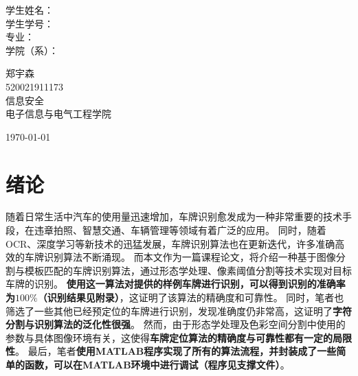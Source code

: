 \documentclass[utf8,a4paper]{ctexart}
\begin{document}
\begin{titlepage}
\begin{center}
        \begin{minipage}{0.2\textwidth}
            \begin{flushright} \large\kaishu
                学生姓名： \\
                学生学号： \\
                专\qquad 业： \\
                学院（系）： \\
            \end{flushright}
        \end{minipage}
        \begin{minipage}{0.4\textwidth}
            \begin{flushleft} \large\kaishu
                \centering 郑宇森\\
                520021911173\\
                信息安全\\
                电子信息与电气工程学院
            \end{flushleft}
        \end{minipage}
        \vfill
        {\large \today}

    \end{center}

\end{titlepage}

\tableofcontents

\newpage

\section{绪论}
随着日常生活中汽车的使用量迅速增加，车牌识别愈发成为一种非常重要的技术手段，在违章拍照、智慧交通、车辆管理等领域有着广泛的应用。
同时，随着OCR、深度学习等新技术的迅猛发展，车牌识别算法也在更新迭代，许多准确高效的车牌识别算法不断涌现。
而本文作为一篇课程论文，将介绍一种基于图像分割与模板匹配的车牌识别算法，通过形态学处理、像素阈值分割等技术实现对目标车牌的识别。
\textbf{使用这一算法对提供的样例车牌进行识别，可以得到识别的准确率为$100\%$（识别结果见附录）}，这证明了该算法的精确度和可靠性。
同时，笔者也筛选了一些其他已经预定位的车牌进行识别，发现准确度仍非常高，这证明了\textbf{字符分割与识别算法的泛化性很强}。
然而，由于形态学处理及色彩空间分割中使用的参数与具体图像环境有关，这使得\textbf{车牌定位算法的精确度与可靠性都有一定的局限性}。
最后，笔者\textbf{使用MATLAB程序实现了所有的算法流程，并封装成了一些简单的函数，可以在MATLAB环境中进行调试（程序见支撑文件）}。
\end{document}
